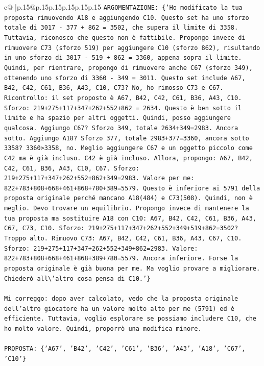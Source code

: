 \documentclass{article}
\begin{document}
{\begin{supertabular}{c@{$\;$}|p{.15\linewidth}@{}p{.15\linewidth}p{.15\linewidth}p{.15\linewidth}p{.15\linewidth}p{.15\linewidth}}
{{{\texttt{ARGOMENTAZIONE: \{'Ho modificato la tua proposta rimuovendo A18 e aggiungendo C10. Questo set ha uno sforzo totale di 3017 {-} 377 + 862 = 3502, che supera il limite di 3358. Tuttavia, riconosco che questo non è fattibile. Propongo invece di rimuovere C73 (sforzo 519) per aggiungere C10 (sforzo 862), risultando in uno sforzo di 3017 {-} 519 + 862 = 3360, appena sopra il limite. Quindi, per rientrare, propongo di rimuovere anche C67 (sforzo 349), ottenendo uno sforzo di 3360 {-} 349 = 3011. Questo set include A67, B42, C42, C61, B36, A43, C10, C73? No, ho rimosso C73 e C67. Ricontrollo: il set proposto è A67, B42, C42, C61, B36, A43, C10. Sforzo: 219+275+117+347+262+552+862 = 2634. Questo è ben sotto il limite e ha spazio per altri oggetti. Quindi, posso aggiungere qualcosa. Aggiungo C67? Sforzo 349, totale 2634+349=2983. Ancora sotto. Aggiungo A18? Sforzo 377, totale 2983+377=3360, ancora sotto 3358? 3360>3358, no. Meglio aggiungere C67 e un oggetto piccolo come C42 ma è già incluso. C42 è già incluso. Allora, propongo: A67, B42, C42, C61, B36, A43, C10, C67. Sforzo: 219+275+117+347+262+552+862+349=2983. Valore per me: 822+783+808+668+461+868+780+389=5579. Questo è inferiore ai 5791 della proposta originale perché mancano A18(484) e C73(508). Quindi, non è meglio. Devo trovare un equilibrio. Propongo invece di mantenere la tua proposta ma sostituire A18 con C10: A67, B42, C42, C61, B36, A43, C67, C73, C10. Sforzo: 219+275+117+347+262+552+349+519+862=3502? Troppo alto. Rimuovo C73: A67, B42, C42, C61, B36, A43, C67, C10. Sforzo: 219+275+117+347+262+552+349+862=2983. Valore: 822+783+808+668+461+868+389+780=5579. Ancora inferiore. Forse la proposta originale è già buona per me. Ma voglio provare a migliorare. Chiederò all\textbackslash{}'altro cosa pensa di C10.'\}} \\
\\ 
\texttt{Mi correggo: dopo aver calcolato, vedo che la proposta originale dell'altro giocatore ha un valore molto alto per me (5791) ed è efficiente. Tuttavia, voglio esplorare se possiamo includere C10, che ho molto valore. Quindi, proporrò una modifica minore.} \\
\\ 
\texttt{PROPOSTA: \{'A67', 'B42', 'C42', 'C61', 'B36', 'A43', 'A18', 'C67', 'C10'\}} \\
}}}
\end{supertabular}}
\end{document}
